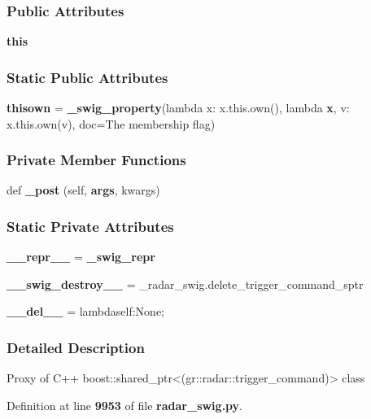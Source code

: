 \subsubsection*{Public Attributes}
\begin{DoxyCompactItemize}
\item 
{\bf this}
\end{DoxyCompactItemize}
\subsubsection*{Static Public Attributes}
\begin{DoxyCompactItemize}
\item 
{\bf thisown} = {\bf \+\_\+swig\+\_\+property}(lambda x\+: x.\+this.\+own(), lambda {\bf x}, v\+: x.\+this.\+own(v), doc=\textquotesingle{}The membership flag\textquotesingle{})
\end{DoxyCompactItemize}
\subsubsection*{Private Member Functions}
\begin{DoxyCompactItemize}
\item 
def {\bf \+\_\+post} (self, {\bf args}, kwargs)
\end{DoxyCompactItemize}
\subsubsection*{Static Private Attributes}
\begin{DoxyCompactItemize}
\item 
{\bf \+\_\+\+\_\+repr\+\_\+\+\_\+} = {\bf \+\_\+swig\+\_\+repr}
\item 
{\bf \+\_\+\+\_\+swig\+\_\+destroy\+\_\+\+\_\+} = \+\_\+radar\+\_\+swig.\+delete\+\_\+trigger\+\_\+command\+\_\+sptr
\item 
{\bf \+\_\+\+\_\+del\+\_\+\+\_\+} = lambdaself\+:\+None;
\end{DoxyCompactItemize}


\subsubsection{Detailed Description}
\begin{DoxyVerb}Proxy of C++ boost::shared_ptr<(gr::radar::trigger_command)> class\end{DoxyVerb}
 

Definition at line {\bf 9953} of file {\bf radar\+\_\+swig.\+py}.



